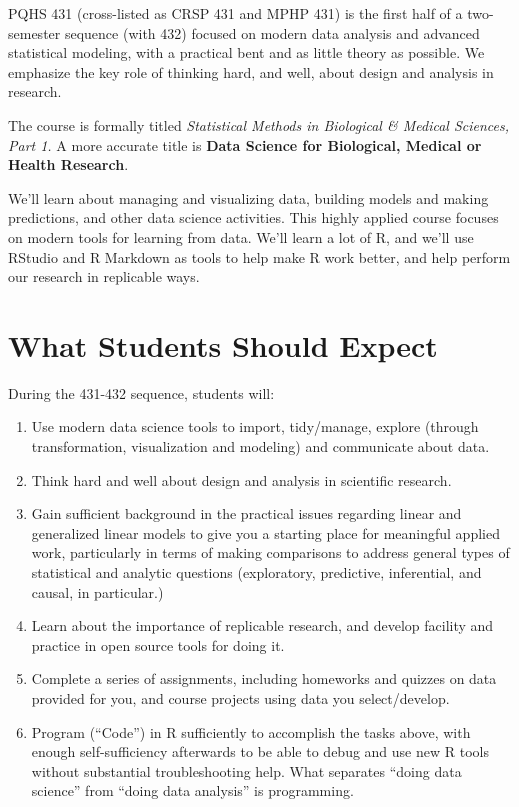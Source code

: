 \documentclass[
]{book}
\providecommand{\tightlist}{%
  \setlength{\itemsep}{0pt}\setlength{\parskip}{0pt}}
\begin{document}
PQHS 431 (cross-listed as CRSP 431 and MPHP 431) is the first half of a two-semester sequence (with 432) focused on modern data analysis and advanced statistical modeling, with a practical bent and as little theory as possible. We emphasize the key role of thinking hard, and well, about design and analysis in research.

The course is formally titled \emph{Statistical Methods in Biological \& Medical Sciences, Part 1.} A more accurate title is \textbf{Data Science for Biological, Medical or Health Research}.

We'll learn about managing and visualizing data, building models and making predictions, and other data science activities. This highly applied course focuses on modern tools for learning from data. We'll learn a lot of R, and we'll use RStudio and R Markdown as tools to help make R work better, and help perform our research in replicable ways.

\hypertarget{what-students-should-expect}{%
\section{What Students Should Expect}\label{what-students-should-expect}}

During the 431-432 sequence, students will:

\begin{enumerate}
\def\labelenumi{\arabic{enumi}.}
\tightlist
\item
  Use modern data science tools to import, tidy/manage, explore (through transformation, visualization and modeling) and communicate about data.
\item
  Think hard and well about design and analysis in scientific research.
\item
  Gain sufficient background in the practical issues regarding linear and generalized linear models to give you a starting place for meaningful applied work, particularly in terms of making comparisons to address general types of statistical and analytic questions (exploratory, predictive, inferential, and causal, in particular.)
\item
  Learn about the importance of replicable research, and develop facility and practice in open source tools for doing it.
\item
  Complete a series of assignments, including homeworks and quizzes on data provided for you, and course projects using data you select/develop.
\item
  Program (``Code'') in R sufficiently to accomplish the tasks above, with enough self-sufficiency afterwards to be able to debug and use new R tools without substantial troubleshooting help. What separates ``doing data science'' from ``doing data analysis'' is programming.
\end{enumerate}
\end{document}

